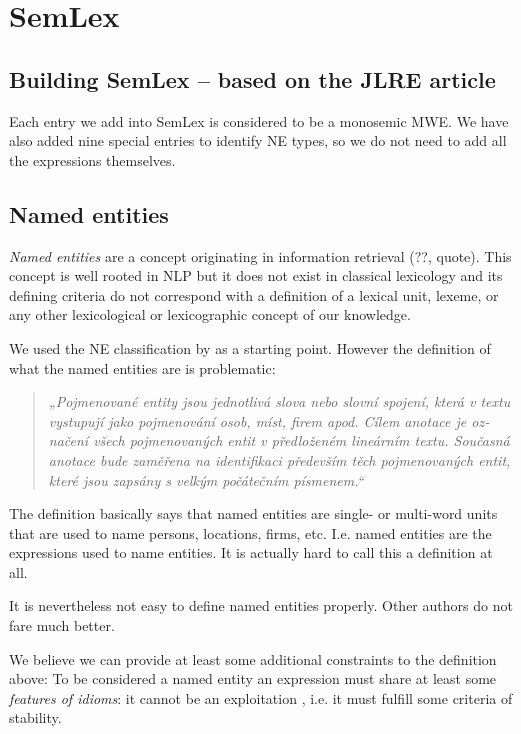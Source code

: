 
\chapter{SemLex}
\label{sec:semlex}

\section{Building SemLex – based on the JLRE article}
\label{sec:semlex:build}
Each entry we add into SemLex is considered to be a monosemic MWE. 
We have also added nine special entries to identify NE types, so we do not need to add all the expressions themselves.

\section{Named entities}
\label{sec:semlex:ne}
\emph{Named entities} are a concept originating in information retrieval (??, quote). This concept is well rooted in NLP but it does not exist in classical lexicology and its defining criteria do not correspond with a definition of a lexical unit, lexeme, or any other lexicological or lexicographic concept of our knowledge.

We used the NE classification by \citet{sevcikova:2007} as a starting point. However the definition of what the named entities are is problematic:
\begin{quote}
\textczech{\em „Pojmenované entity jsou jednotlivá slova nebo slovní spojení, která v textu vystupují jako
pojmenování osob, míst, firem apod. Cílem anotace je označení všech pojmenovaných entit v 
předloženém lineárním textu. Současná anotace bude zaměřena na identifikaci
především těch pojmenovaných entit, které jsou zapsány s velkým počátečním písmenem.“}
\end{quote}
The definition basically says that named entities are single- or multi-word units that are used to name persons, locations, firms, etc. I.e. named entities are the expressions used to name entities. It is actually hard to call this a definition at all.

It is nevertheless not easy to define named entities properly. Other authors do not fare much better.

We believe we can provide at least some additional constraints to the definition above: To be considered a named entity an expression must share at least some 
\emph{features of idioms}: it cannot be an exploitation \citep[see][]{hanks:norms}, i.e. it must fulfill some criteria of stability. 


